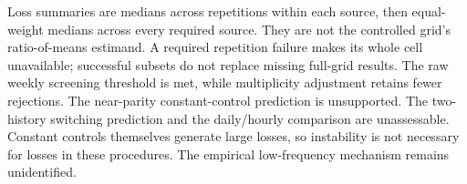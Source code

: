 



Loss summaries are medians across repetitions within each source, then equal-weight medians across every required source. They are not the controlled
grid's ratio-of-means estimand. A required repetition failure makes its whole
cell unavailable; successful subsets do not replace missing full-grid results.
The raw weekly screening threshold is met, while multiplicity adjustment
retains fewer rejections. The near-parity constant-control prediction is
unsupported. The two-history switching prediction and the daily/hourly
comparison are unassessable. Constant controls themselves generate large
losses, so instability is not necessary for losses in these procedures.
The empirical low-frequency mechanism remains unidentified.

